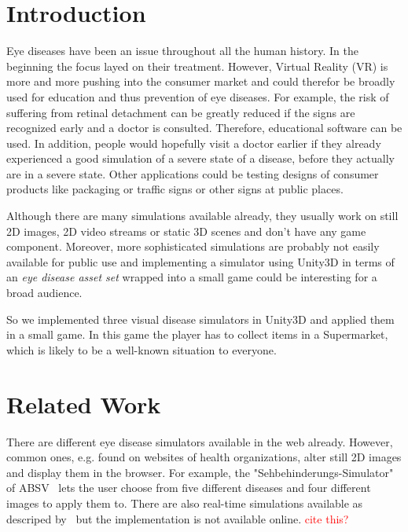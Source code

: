 \documentclass{acm_proc_article-sp}
\newcommand{\todo}[1]{\textcolor{Red}{#1}}
\begin{document}
%

%
%
% 

\section{Introduction}
Eye diseases have been an issue throughout all the human history.
In the beginning the focus layed on their treatment.
However, Virtual Reality (VR) is more and more pushing into the consumer market and could therefor be broadly used for education and thus prevention of eye diseases.
For example, the risk of suffering from retinal detachment can be greatly reduced if the signs are recognized early and a doctor is consulted.
Therefore, educational software can be used.
In addition, people would hopefully visit a doctor earlier if they already experienced a good simulation of a severe state of a disease, before they actually are in a severe state.
Other applications could be testing designs of consumer products like packaging or traffic signs or other signs at public places.

Although there are many simulations available already, they usually work on still 2D images, 2D video streams or static 3D scenes and don't have any game component.
Moreover, more sophisticated simulations are probably not easily available for public use and implementing a simulator using Unity3D in terms of an \emph{eye disease asset set} wrapped into a small game could be interesting for a broad audience.

So we implemented three visual disease simulators in Unity3D and applied them in a small game.
In this game the player has to collect items in a Supermarket, which is likely to be a well-known situation to everyone.

\section{Related Work}
There are different eye disease simulators available in the web already.
However, common ones, e.g. found on websites of health organizations, alter still 2D images and display them in the browser.
For example, the "Sehbehinderungs-Simulator" of ABSV~\cite{absv} lets the user choose from five different diseases and four different images to apply them to. 
There are also real-time simulations available as descriped by~\cite{eyediseasesim-zhuming} but the implementation is not available online.
\todo{cite this?}~\cite{eyediseasesim}
\end{document}
